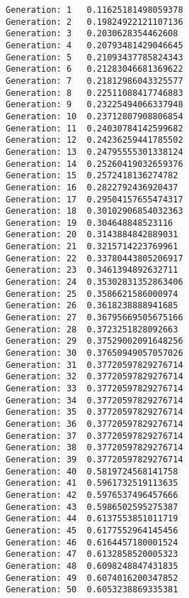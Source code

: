 \documentclass[11pt]{article}
\begin{document}
    \begin{Verbatim}[commandchars=\\\{\}]
Generation: 1   0.11625181498059378
Generation: 2   0.19824922121107136
Generation: 3   0.2030628354462608
Generation: 4   0.20793481429046645
Generation: 5   0.21093437785824343
Generation: 6   0.21283046681369622
Generation: 7   0.21812986043325577
Generation: 8   0.22511088417746883
Generation: 9   0.23225494066337948
Generation: 10  0.23712807908806854
Generation: 11  0.24030784142599682
Generation: 12  0.24236259441785502
Generation: 13  0.24795555301338124
Generation: 14  0.25260419032659376
Generation: 15  0.2572418136274782
Generation: 16  0.2822792436920437
Generation: 17  0.29504157655474317
Generation: 18  0.30102906854032363
Generation: 19  0.304648848523116
Generation: 20  0.3143884842889031
Generation: 21  0.3215714223769961
Generation: 22  0.33780443805206917
Generation: 23  0.3461394892632711
Generation: 24  0.35302831352863406
Generation: 25  0.3586621586000974
Generation: 26  0.3618238888941685
Generation: 27  0.36795669505675166
Generation: 28  0.3723251828092663
Generation: 29  0.37529002091648256
Generation: 30  0.37650949057057026
Generation: 31  0.37720597829276714
Generation: 32  0.37720597829276714
Generation: 33  0.37720597829276714
Generation: 34  0.37720597829276714
Generation: 35  0.37720597829276714
Generation: 36  0.37720597829276714
Generation: 37  0.37720597829276714
Generation: 38  0.37720597829276714
Generation: 39  0.37720597829276714
Generation: 40  0.5819724568141758
Generation: 41  0.5961732519113635
Generation: 42  0.5976537496457666
Generation: 43  0.5986502595275387
Generation: 44  0.6137553851011719
Generation: 45  0.6177552964145456
Generation: 46  0.6164457180001524
Generation: 47  0.6132858520005323
Generation: 48  0.6098248847431835
Generation: 49  0.6074016200347852
Generation: 50  0.6053238869335381
    \end{Verbatim}


    
    
    
\end{document}

